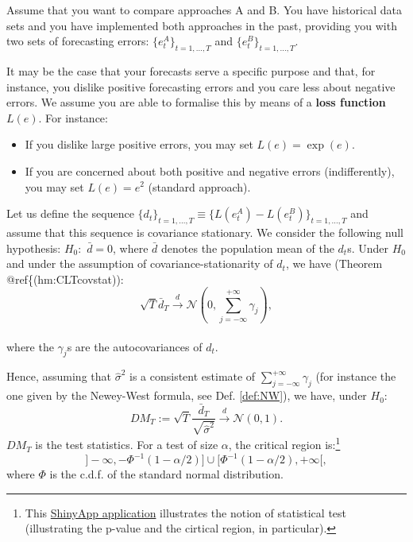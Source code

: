 \documentclass[
  12pt,
]{book}
\providecommand{\tightlist}{%
  \setlength{\itemsep}{0pt}\setlength{\parskip}{0pt}}
\theoremstyle{definition}
\theoremstyle{definition}
\theoremstyle{definition}
\theoremstyle{definition}
\theoremstyle{remark}
\begin{document}
Assume that you want to compare approaches A and B. You have historical data sets and you have implemented both approaches in the past, providing you with two sets of forecasting errors: \(\{e^{A}_t\}_{t=1,\dots,T}\) and \(\{e^{B}_t\}_{t=1,\dots,T}\).

It may be the case that your forecasts serve a specific purpose and that, for instance, you dislike positive forecasting errors and you care less about negative errors. We assume you are able to formalise this by means of a \textbf{loss function \(L(e)\)}. For instance:

\begin{itemize}
\tightlist
\item
  If you dislike large positive errors, you may set \(L(e)=\exp(e)\).
\item
  If you are concerned about both positive and negative errors (indifferently), you may set \(L(e)=e^2\) (standard approach).
\end{itemize}

Let us define the sequence \(\{d_t\}_{t=1,\dots,T} \equiv \{L(e^{A}_t)-L(e^{B}_t)\}_{t=1,\dots,T}\) and assume that this sequence is covariance stationary. We consider the following null hypothesis: \(H_0:\) \(\bar{d}=0\), where \(\bar{d}\) denotes the population mean of the \(d_t\)s. Under \(H_0\) and under the assumption of covariance-stationarity of \(d_t\), we have (Theorem @ref\{(hm:CLTcovstat)):
\[
\sqrt{T} \bar{d}_T \overset{d}{\rightarrow} \mathcal{N}\left(0,\sum_{j=-\infty}^{+\infty} \gamma_j \right),
\]\\
where the \(\gamma_j\)s are the autocovariances of \(d_t\).

Hence, assuming that \(\hat{\sigma}^2\) is a consistent estimate of \(\sum_{j=-\infty}^{+\infty} \gamma_j\) (for instance the one given by the Newey-West formula, see Def. \ref{def:NW}), we have, under \(H_0\):
\[
DM_T := \sqrt{T}\frac{\bar{d}_T}{\sqrt{\hat{\sigma}^2}} \overset{d}{\rightarrow}  \mathcal{N}(0,1).
\]
\(DM_T\) is the test statistics. For a test of size \(\alpha\), the critical region is:\footnote{This \href{https://jrenne.shinyapps.io/tests/}{ShinyApp application} illustrates the notion of statistical test (illustrating the p-value and the cirtical region, in particular).}
\[
]-\infty,-\Phi^{-1}(1-\alpha/2)] \cup [\Phi^{-1}(1-\alpha/2),+\infty[,
\]
where \(\Phi\) is the c.d.f. of the standard normal distribution.
\end{document}
